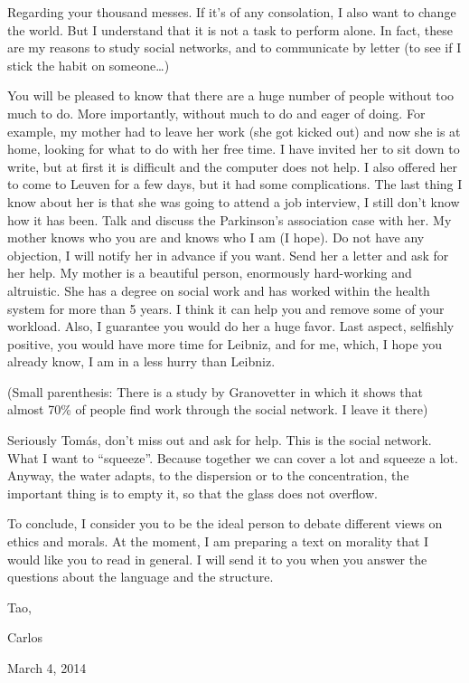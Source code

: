 \documentclass[]{book}
\begin{document}
Regarding your thousand messes. If it's of any consolation, I also want to change the world. But I understand that it is not a task to perform alone. In fact, these are my reasons to study social networks, and to communicate by letter (to see if I stick the habit on someone\ldots)

You will be pleased to know that there are a huge number of people without too much to do. More importantly, without much to do and eager of doing. For example, my mother had to leave her work (she got kicked out) and now she is at home, looking for what to do with her free time. I have invited her to sit down to write, but at first it is difficult and the computer does not help. I also offered her to come to Leuven for a few days, but it had some complications. The last thing I know about her is that she was going to attend a job interview, I still don't know how it has been. Talk and discuss the Parkinson's association case with her. My mother knows who you are and knows who I am (I hope). Do not have any objection, I will notify her in advance if you want. Send her a letter and ask for her help. My mother is a beautiful person, enormously hard-working and altruistic. She has a degree on social work and has worked within the health system for more than 5 years. I think it can help you and remove some of your workload. Also, I guarantee you would do her a huge favor. Last aspect, selfishly positive, you would have more time for Leibniz, and for me, which, I hope you already know, I am in a less hurry than Leibniz.

(Small parenthesis: There is a study by Granovetter \citep{granovetter1983strength} in which it shows that almost 70\% of people find work through the social network. I leave it there)

Seriously Tomás, don't miss out and ask for help. This is the social network. What I want to ``squeeze''. Because together we can cover a lot and squeeze a lot. Anyway, the water adapts, to the dispersion or to the concentration, the important thing is to empty it, so that the glass does not overflow.

To conclude, I consider you to be the ideal person to debate different views on ethics and morals. At the moment, I am preparing a text on morality that I would like you to read in general. I will send it to you when you answer the questions about the language and the structure.

Tao,

Carlos

March 4, 2014
\end{document}
